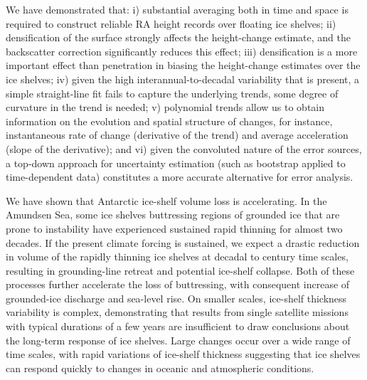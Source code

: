 We have demonstrated that: i) substantial averaging both in time and space is required to
construct reliable RA height records over floating ice shelves; ii) densification of the surface
strongly affects the height-change estimate, and the backscatter correction significantly reduces
this effect; iii) densification is a more important effect than penetration in biasing the height-change
estimates over the ice shelves; iv) given the high interannual-to-decadal variability that is present, a
simple straight-line fit fails to capture the underlying trends, some degree of curvature in the
trend is needed; v) polynomial trends allow us to obtain information on the evolution and spatial
structure of changes, for instance, instantaneous rate of change (derivative of the trend) and average
acceleration (slope of the derivative); and vi) given the convoluted nature of the error sources, a top-down approach for uncertainty estimation (such as bootstrap applied to time-dependent data) constitutes a more accurate alternative for error analysis.

We have shown that Antarctic ice-shelf volume
loss is accelerating. In the Amundsen Sea,
some ice shelves buttressing regions of grounded
ice that are prone to instability have experienced
sustained rapid thinning for almost two decades.
If the present climate forcing is sustained, we
expect a drastic reduction in volume of the rapidly
thinning ice shelves at decadal to century
time scales, resulting in grounding-line retreat
and potential ice-shelf collapse. Both of these processes
further accelerate the loss of buttressing,
with consequent increase of grounded-ice
discharge and sea-level rise. On smaller scales,
ice-shelf thickness variability is complex, demonstrating
that results from single satellite missions
with typical durations of a few years are
insufficient to draw conclusions about the long-term
response of ice shelves. Large changes occur
over a wide range of time scales, with rapid variations
of ice-shelf thickness suggesting that ice
shelves can respond quickly to changes in oceanic
and atmospheric conditions.

